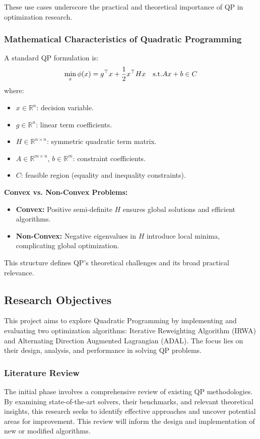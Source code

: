 \documentclass{article}
\begin{document}
These use cases underscore the practical and theoretical importance of QP in optimization research.

\subsubsection{Mathematical Characteristics of Quadratic Programming}
A standard QP formulation is:
\[
\min_x \phi(x) = g^\top x + \frac{1}{2}x^{\top} H x \quad \textup{s.t.} A x + b \in C
\]
where:
\begin{itemize}
    \item $x \in \mathbb{R}^n$: decision variable.
    \item $g \in \mathbb{R}^n$: linear term coefficients.
    \item $H \in \mathbb{R}^{n \times n}$: symmetric quadratic term matrix.
    \item $A \in \mathbb{R}^{m \times n}$, $b \in \mathbb{R}^m$: constraint coefficients.
    \item $C$: feasible region (equality and inequality constraints).
\end{itemize}

\textbf{Convex vs. Non-Convex Problems:}
\begin{itemize}
    \item \textbf{Convex:} Positive semi-definite $H$ ensures global solutions and efficient algorithms.
    \item \textbf{Non-Convex:} Negative eigenvalues in $H$ introduce local minima, complicating global optimization.
\end{itemize}

This structure defines QP's theoretical challenges and its broad practical relevance.

\subsection{Research Objectives}

This project aims to explore Quadratic Programming by implementing and evaluating two optimization algorithms: Iterative Reweighting Algorithm (IRWA) and Alternating Direction Augmented Lagrangian (ADAL). The focus lies on their design, analysis, and performance in solving QP problems.

\subsubsection{Literature Review}
The initial phase involves a comprehensive review of existing QP methodologies. By examining state-of-the-art solvers, their benchmarks, and relevant theoretical insights, this research seeks to identify effective approaches and uncover potential areas for improvement. This review will inform the design and implementation of new or modified algorithms.
\end{document}
